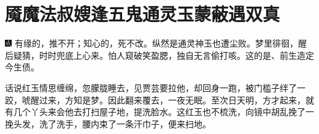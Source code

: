 

\chapter{魇魔法叔嫂逢五鬼\hspace{.5em}通灵玉蒙蔽遇双真}

{\includegraphics[width=3mm]{../Images/00005}  \kaishu 有缘的，推不开；知心的，死不改。纵然是通灵神玉也遭尘败。梦里徘徊，醒后疑猜，时时兜底上心来。怕人窥破笑盈腮，独自无言偷打咳。这的是、前生造定今生债。}

话说红玉情思缠绵，忽朦胧睡去，见贾芸要拉他，却回身一跑，被门槛子绊了一跤，唬醒过来，方知是梦。因此翻来覆去，一夜无眠。至次日天明，方才起来，就有几个丫头来会他去打扫屋子地，提洗脸水。这红玉也不梳洗，向镜中胡乱挽了一挽头发，洗了洗手，腰内束了一条汗巾子，便来扫地。

